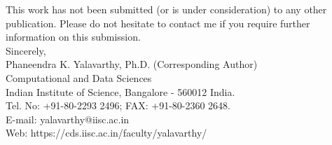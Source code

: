 \documentclass[float=false, crop=false]{standalone}
\begin{document}
\begin{large}
This work has not been submitted (or is under consideration) to any other publication. Please do not hesitate to contact me if you require further information on this submission.\\


\noindent Sincerely,\\
Phaneendra K. Yalavarthy, Ph.D. (Corresponding Author)\\
Computational and Data Sciences\\ 
Indian Institute of Science, Bangalore - 560012 India. \\
Tel. No: +91-80-2293 2496; FAX: +91-80-2360 2648.\\
E-mail: yalavarthy@iisc.ac.in\\
Web: https://cds.iisc.ac.in/faculty/yalavarthy/
\end{large}
\end{document}
